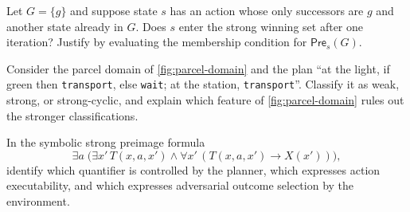 \begin{chapex}
Let $G=\{g\}$ and suppose state $s$ has an action whose only successors
are $g$ and another state already in $G$.  Does $s$ enter the strong
winning set after one iteration?  Justify by evaluating the membership
condition for $\mathsf{Pre}_s(G)$.
\end{chapex}

\begin{chapex}
Consider the parcel domain of \cref{fig:parcel-domain} and the plan
``at the light, if green then \texttt{transport}, else \texttt{wait};
at the station, \texttt{transport}''.  Classify it as weak, strong, or
strong-cyclic, and explain which feature of \cref{fig:parcel-domain}
rules out the stronger classifications.
\end{chapex}

\begin{chapex}
In the symbolic strong preimage formula
\[
  \exists a\;\big(\exists x'\,T(x,a,x')\wedge \forall x'\,(T(x,a,x')\rightarrow X(x'))\big),
\]
identify which quantifier is controlled by the planner, which expresses
action executability, and which expresses adversarial outcome
selection by the environment.
\end{chapex}
